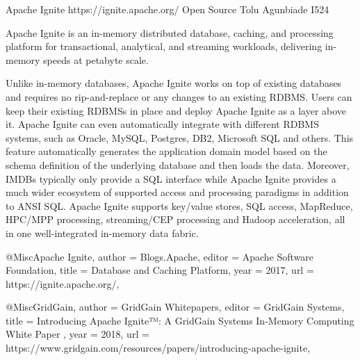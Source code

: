 Apache Ignite https://ignite.apache.org/ Open Source Tolu Agunbiade I524

Apache Ignite is an in-memory distributed database, caching, and processing
platform for transactional, analytical, and streaming workloads, delivering
in-memory speeds at petabyte scale\cite{Apache Ignite}.

Unlike in-memory databases, Apache Ignite works on top of existing databases and
requires no rip-and-replace or any changes to an existing RDBMS. Users can keep
their existing RDBMSs in place and deploy Apache Ignite as a layer above it.
Apache Ignite can even automatically integrate with different RDBMS systems,
such as Oracle, MySQL, Postgres, DB2, Microsoft SQL and others. This feature
automatically generates the application domain model based on the schema
definition of the underlying database and then loads the data. Moreover, IMDBs
typically only provide a SQL interface while Apache Ignite provides a much wider
ecosystem of supported access and processing paradigms in addition to ANSI SQL.
Apache Ignite supports key/value stores, SQL access, MapReduce, HPC/MPP
processing, streaming/CEP processing and Hadoop acceleration, all in one
well-integrated in-memory data fabric\cite{GridGain}.


@Misc{Apache Ignite, author = {Blogs.Apache}, editor = {Apache Software
Foundation}, title = {Database and Caching Platform}, year = {2017}, url =
{https://ignite.apache.org/}, }


@Misc{GridGain, author = {GridGain Whitepapers}, editor = {GridGain Systems},
title = {Introducing Apache Ignite™: A GridGain Systems In-Memory Computing
White Paper }, year = {2018}, url =
{https://www.gridgain.com/resources/papers/introducing-apache-ignite}, }
